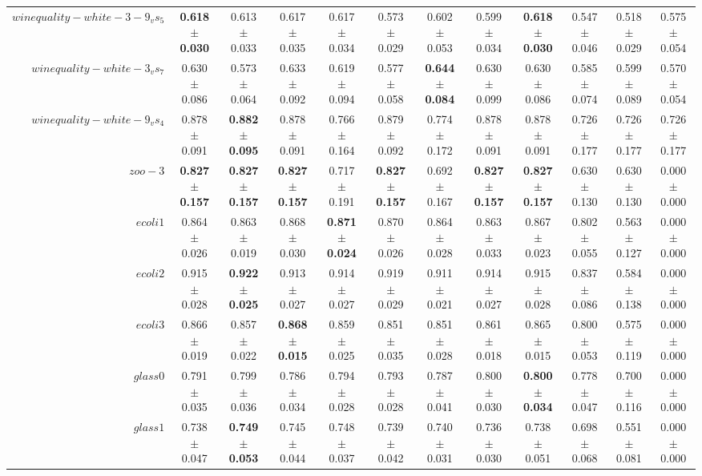 \begin{table}[!ht]
{\begin{tabular}{r c c c c c c c c c c c}
$winequality-white-3-9_vs_5$ & \textbf{0.618 $\pm$ 0.030} & 0.613 $\pm$ 0.033 & 0.617 $\pm$ 0.035 & 0.617 $\pm$ 0.034 & 0.573 $\pm$ 0.029 & 0.602 $\pm$ 0.053 & 0.599 $\pm$ 0.034 & \textbf{0.618 $\pm$ 0.030} & 0.547 $\pm$ 0.046 & 0.518 $\pm$ 0.029 & 0.575 $\pm$ 0.054 \\
$winequality-white-3_vs_7$ & 0.630 $\pm$ 0.086 & 0.573 $\pm$ 0.064 & 0.633 $\pm$ 0.092 & 0.619 $\pm$ 0.094 & 0.577 $\pm$ 0.058 & \textbf{0.644 $\pm$ 0.084} & 0.630 $\pm$ 0.099 & 0.630 $\pm$ 0.086 & 0.585 $\pm$ 0.074 & 0.599 $\pm$ 0.089 & 0.570 $\pm$ 0.054 \\
$winequality-white-9_vs_4$ & 0.878 $\pm$ 0.091 & \textbf{0.882 $\pm$ 0.095} & 0.878 $\pm$ 0.091 & 0.766 $\pm$ 0.164 & 0.879 $\pm$ 0.092 & 0.774 $\pm$ 0.172 & 0.878 $\pm$ 0.091 & 0.878 $\pm$ 0.091 & 0.726 $\pm$ 0.177 & 0.726 $\pm$ 0.177 & 0.726 $\pm$ 0.177 \\
$zoo-3$ & \textbf{0.827 $\pm$ 0.157} & \textbf{0.827 $\pm$ 0.157} & \textbf{0.827 $\pm$ 0.157} & 0.717 $\pm$ 0.191 & \textbf{0.827 $\pm$ 0.157} & 0.692 $\pm$ 0.167 & \textbf{0.827 $\pm$ 0.157} & \textbf{0.827 $\pm$ 0.157} & 0.630 $\pm$ 0.130 & 0.630 $\pm$ 0.130 & 0.000 $\pm$ 0.000 \\
$ecoli1$ & 0.864 $\pm$ 0.026 & 0.863 $\pm$ 0.019 & 0.868 $\pm$ 0.030 & \textbf{0.871 $\pm$ 0.024} & 0.870 $\pm$ 0.026 & 0.864 $\pm$ 0.028 & 0.863 $\pm$ 0.033 & 0.867 $\pm$ 0.023 & 0.802 $\pm$ 0.055 & 0.563 $\pm$ 0.127 & 0.000 $\pm$ 0.000 \\
$ecoli2$ & 0.915 $\pm$ 0.028 & \textbf{0.922 $\pm$ 0.025} & 0.913 $\pm$ 0.027 & 0.914 $\pm$ 0.027 & 0.919 $\pm$ 0.029 & 0.911 $\pm$ 0.021 & 0.914 $\pm$ 0.027 & 0.915 $\pm$ 0.028 & 0.837 $\pm$ 0.086 & 0.584 $\pm$ 0.138 & 0.000 $\pm$ 0.000 \\
$ecoli3$ & 0.866 $\pm$ 0.019 & 0.857 $\pm$ 0.022 & \textbf{0.868 $\pm$ 0.015} & 0.859 $\pm$ 0.025 & 0.851 $\pm$ 0.035 & 0.851 $\pm$ 0.028 & 0.861 $\pm$ 0.018 & 0.865 $\pm$ 0.015 & 0.800 $\pm$ 0.053 & 0.575 $\pm$ 0.119 & 0.000 $\pm$ 0.000 \\
$glass0$ & 0.791 $\pm$ 0.035 & 0.799 $\pm$ 0.036 & 0.786 $\pm$ 0.034 & 0.794 $\pm$ 0.028 & 0.793 $\pm$ 0.028 & 0.787 $\pm$ 0.041 & 0.800 $\pm$ 0.030 & \textbf{0.800 $\pm$ 0.034} & 0.778 $\pm$ 0.047 & 0.700 $\pm$ 0.116 & 0.000 $\pm$ 0.000 \\
$glass1$ & 0.738 $\pm$ 0.047 & \textbf{0.749 $\pm$ 0.053} & 0.745 $\pm$ 0.044 & 0.748 $\pm$ 0.037 & 0.739 $\pm$ 0.042 & 0.740 $\pm$ 0.031 & 0.736 $\pm$ 0.030 & 0.738 $\pm$ 0.051 & 0.698 $\pm$ 0.068 & 0.551 $\pm$ 0.081 & 0.000 $\pm$ 0.000 \\

\end{tabular}}
\end{table}
